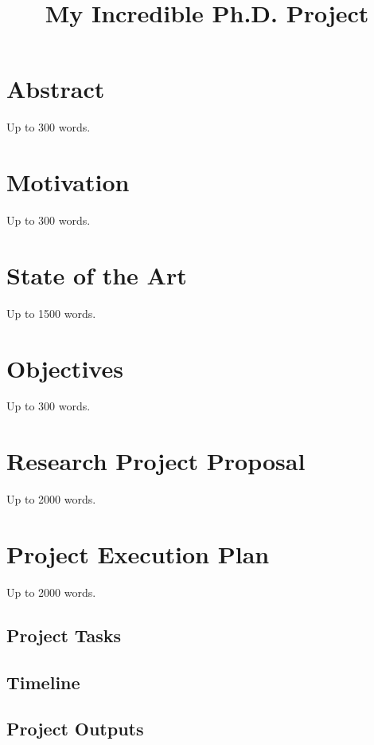 \documentclass{proposal}
\title{My Incredible Ph.D. Project}
\begin{document}
\section*{Abstract}

Up to 300 words.





\section*{Motivation}

Up to 300 words.





\section*{State of the Art}

Up to 1500 words.





\section*{Objectives}

Up to 300 words.





\section*{Research Project Proposal}

Up to 2000 words.





\section*{Project Execution Plan}

Up to 2000 words.

\subsection*{Project Tasks}


\subsection*{Timeline}


\subsection*{Project Outputs}
\end{document}
